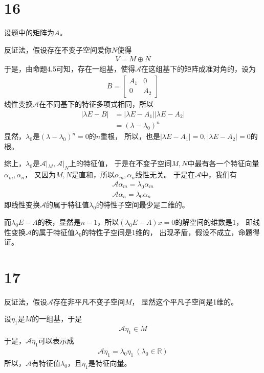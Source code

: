 \documentclass{article}
\begin{document}
\section*{16}

设题中的矩阵为$A$。

反证法，假设存在不变子空间爱你$N$使得
\begin{align*}
  V = M \oplus N
\end{align*}
于是，由命题4.5可知，存在一组基，使得$\mathscr{A}$在这组基下的矩阵成准对角的，设为
\begin{align*}
  B = \begin{bmatrix}
        A_1 & 0   \\
        0   & A_2
      \end{bmatrix}
\end{align*}
线性变换$\mathscr{A}$在不同基下的特征多项式相同，所以
\begin{align*}
  |\lambda E - B|
   & = |\lambda E - A_1| |\lambda E - A_2| \\
   & = (\lambda - \lambda_0)^n
\end{align*}
显然，$\lambda_0$是$(\lambda - \lambda_0)^n = 0$的$n$重根，
所以，也是$|\lambda E - A_1| = 0, |\lambda E - A_2| = 0$的根。

综上，$\lambda_0$是$\mathscr{A}|_M, \mathscr{A}|_N$上的特征值，
于是在不变子空间$M,N$中最有各一个特征向量$\alpha_m, \alpha_n$，
又因为$M, N$是直和，所以$\alpha_m, \alpha_n$线性无关。
于是在$\mathscr{A}$中，我们有
\begin{align*}
  \mathscr{A} \alpha_m = \lambda_0 \alpha_m \\
  \mathscr{A} \alpha_n = \lambda_0 \alpha_n
\end{align*}
即线性变换$\mathscr{A}$的属于特征值$\lambda_0$的特性子空间最少是二维的。

而$\lambda_0E - A$的秩，显然是$n - 1$，所以$(\lambda_0E - A)x = 0$的解空间的维数是1，
即线性变换$\mathscr{A}$的属于特征值$\lambda_0$的特性子空间是1维的，
出现矛盾，假设不成立，命题得证。

\section*{17}

反证法，假设$\mathscr{A}$存在非平凡不变子空间$M$，
显然这个平凡子空间是1维的。

设$\eta_1$是$M$的一组基，于是
\begin{align*}
  \mathscr{A} \eta_1 \in M
\end{align*}
于是，$\mathscr{A} \eta_1$可以表示成
\begin{align*}
  \mathscr{A} \eta_1 = \lambda_0 \eta_1 \ (\lambda_0 \in \mathbb{R})
\end{align*}
所以，$\mathscr{A}$有特征值$\lambda_0$，且$\eta_1$是特征向量。
\end{document}
